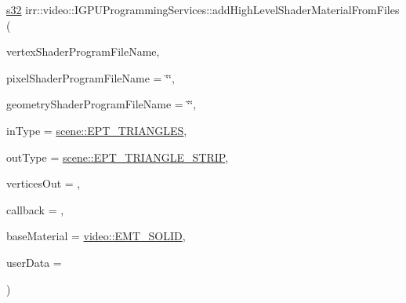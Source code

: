 {\footnotesize\ttfamily \hyperlink{namespaceirr_ac66849b7a6ed16e30ebede579f9b47c6}{s32} irr\+::video\+::\+I\+G\+P\+U\+Programming\+Services\+::add\+High\+Level\+Shader\+Material\+From\+Files (\begin{DoxyParamCaption}\item[{const \hyperlink{namespaceirr_1_1io_a6468281622ce3a1c46b72e19f32dded5}{io\+::path} \&}]{vertex\+Shader\+Program\+File\+Name,  }\item[{const \hyperlink{namespaceirr_1_1io_a6468281622ce3a1c46b72e19f32dded5}{io\+::path} \&}]{pixel\+Shader\+Program\+File\+Name = {\ttfamily \char`\"{}\char`\"{}},  }\item[{const \hyperlink{namespaceirr_1_1io_a6468281622ce3a1c46b72e19f32dded5}{io\+::path} \&}]{geometry\+Shader\+Program\+File\+Name = {\ttfamily \char`\"{}\char`\"{}},  }\item[{\hyperlink{namespaceirr_1_1scene_a5d7de82f2169761194b2f44d95cdc1dc}{scene\+::\+E\+\_\+\+P\+R\+I\+M\+I\+T\+I\+V\+E\+\_\+\+T\+Y\+PE}}]{in\+Type = {\ttfamily \hyperlink{namespaceirr_1_1scene_a5d7de82f2169761194b2f44d95cdc1dca6c884c4de3210b3ed36c99fb828ce376}{scene\+::\+E\+P\+T\+\_\+\+T\+R\+I\+A\+N\+G\+L\+ES}},  }\item[{\hyperlink{namespaceirr_1_1scene_a5d7de82f2169761194b2f44d95cdc1dc}{scene\+::\+E\+\_\+\+P\+R\+I\+M\+I\+T\+I\+V\+E\+\_\+\+T\+Y\+PE}}]{out\+Type = {\ttfamily \hyperlink{namespaceirr_1_1scene_a5d7de82f2169761194b2f44d95cdc1dcab294abafc2b538342892eac7441faf3a}{scene\+::\+E\+P\+T\+\_\+\+T\+R\+I\+A\+N\+G\+L\+E\+\_\+\+S\+T\+R\+IP}},  }\item[{\hyperlink{namespaceirr_a0416a53257075833e7002efd0a18e804}{u32}}]{vertices\+Out = {},  }\item[{\hyperlink{classirr_1_1video_1_1IShaderConstantSetCallBack}{I\+Shader\+Constant\+Set\+Call\+Back} $\ast$}]{callback = {},  }\item[{\hyperlink{namespaceirr_1_1video_ac8e9b6c66f7cebabd1a6d30cbc5430f1}{E\+\_\+\+M\+A\+T\+E\+R\+I\+A\+L\+\_\+\+T\+Y\+PE}}]{base\+Material = {\ttfamily \hyperlink{namespaceirr_1_1video_ac8e9b6c66f7cebabd1a6d30cbc5430f1aa0b13db05ac3b5f40e692769de202660}{video\+::\+E\+M\+T\+\_\+\+S\+O\+L\+ID}},  }\item[{\hyperlink{namespaceirr_ac66849b7a6ed16e30ebede579f9b47c6}{s32}}]{user\+Data = {} }\end{DoxyParamCaption})\hspace{0.3cm}{\ttfamily [inline]}}



